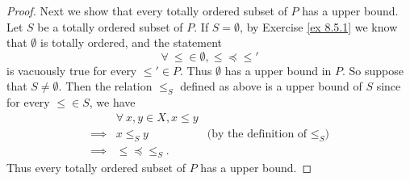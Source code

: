 \begin{proof}
    Next we show that every totally ordered subset of \(P\) has a upper bound.
    Let \(S\) be a totally ordered subset of \(P\).
    If \(S = \emptyset\), by Exercise \ref{ex 8.5.1} we know that \(\emptyset\) is totally ordered, and the statement
    \[
        \forall\ \leq \in \emptyset, \leq \preceq \leq'
    \]
    is vacuously true for every \(\leq' \in P\).
    Thus \(\emptyset\) has a upper bound in \(P\).
    So suppose that \(S \neq \emptyset\).
    Then the relation \(\leq_S\) defined as above is a upper bound of \(S\) since for every \(\leq \in S\), we have
    \begin{align*}
                 & \forall\ x, y \in X, x \leq y                                            \\
        \implies & x \leq_S y                    & \text{(by the definition of \(\leq_S\))} \\
        \implies & \leq \preceq \leq_S.
    \end{align*}
    Thus every totally ordered subset of \(P\) has a upper bound.


\end{proof}
